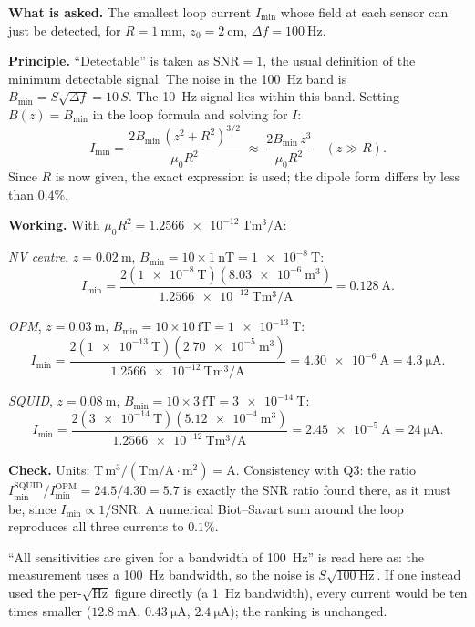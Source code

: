 \documentclass[11pt]{article}
\begin{document}
\textbf{What is asked.} The smallest loop current $I_{\min}$ whose field at each sensor can just be
detected, for $R=\SI{1}{\milli\metre}$, $z_0=\SI{2}{\centi\metre}$, $\Delta f = \SI{100}{\hertz}$.

\textbf{Principle.} ``Detectable'' is taken as $\mathrm{SNR}=1$, the usual definition of the minimum
detectable signal. The noise in the \SI{100}{\hertz} band is $B_{\min} = S\sqrt{\Delta f} = 10\,S$.
The \SI{10}{\hertz} signal lies within this band. Setting $B(z) = B_{\min}$ in the loop formula
and solving for $I$:
\[
I_{\min} = \frac{2 B_{\min}\,(z^2+R^2)^{3/2}}{\mu_0 R^2}
\;\approx\; \frac{2 B_{\min}\, z^3}{\mu_0 R^2}\quad (z\gg R).
\]
Since $R$ is now given, the exact expression is used; the dipole form differs by less than $0.4\%$.

\textbf{Working.} With $\mu_0 R^2 = \SI{1.2566e-12}{\tesla\metre\cubed\per\ampere}$:

\emph{NV centre}, $z = \SI{0.02}{\metre}$, $B_{\min} = 10\times\SI{1}{\nano\tesla} = \SI{1e-8}{\tesla}$:
\[ I_{\min} = \frac{2(\SI{1e-8}{\tesla})(\SI{8.03e-6}{\metre\cubed})}{\SI{1.2566e-12}{\tesla\metre\cubed\per\ampere}}
 = \SI{0.128}{\ampere}. \]

\emph{OPM}, $z = \SI{0.03}{\metre}$, $B_{\min} = 10\times\SI{10}{\femto\tesla} = \SI{1e-13}{\tesla}$:
\[ I_{\min} = \frac{2(\SI{1e-13}{\tesla})(\SI{2.70e-5}{\metre\cubed})}{\SI{1.2566e-12}{\tesla\metre\cubed\per\ampere}}
 = \SI{4.30e-6}{\ampere} = \SI{4.3}{\micro\ampere}. \]

\emph{SQUID}, $z = \SI{0.08}{\metre}$, $B_{\min} = 10\times\SI{3}{\femto\tesla} = \SI{3e-14}{\tesla}$:
\[ I_{\min} = \frac{2(\SI{3e-14}{\tesla})(\SI{5.12e-4}{\metre\cubed})}{\SI{1.2566e-12}{\tesla\metre\cubed\per\ampere}}
 = \SI{2.45e-5}{\ampere} = \SI{24}{\micro\ampere}. \]

\textbf{Check.} Units: $\si{\tesla}\,\si{\metre\cubed}/(\si{\tesla\metre\per\ampere}\cdot\si{\metre\squared}) = \si{\ampere}$.
Consistency with Q3: the ratio $I_{\min}^{\mathrm{SQUID}}/I_{\min}^{\mathrm{OPM}} = 24.5/4.30 = 5.7$ is
exactly the SNR ratio found there, as it must be, since $I_{\min}\propto 1/\mathrm{SNR}$. A
numerical Biot--Savart sum around the loop reproduces all three currents to $0.1\%$.

\begin{notebox}
``All sensitivities are given for a bandwidth of \SI{100}{\hertz}'' is read here as: the
measurement uses a \SI{100}{\hertz} bandwidth, so the noise is $S\sqrt{\SI{100}{\hertz}}$. If one
instead used the per-$\sqrt{\mathrm{Hz}}$ figure directly (a \SI{1}{\hertz} bandwidth), every current
would be ten times smaller ($\SI{12.8}{\milli\ampere}$, $\SI{0.43}{\micro\ampere}$, $\SI{2.4}{\micro\ampere}$);
the ranking is unchanged.
\end{notebox}
\end{document}
